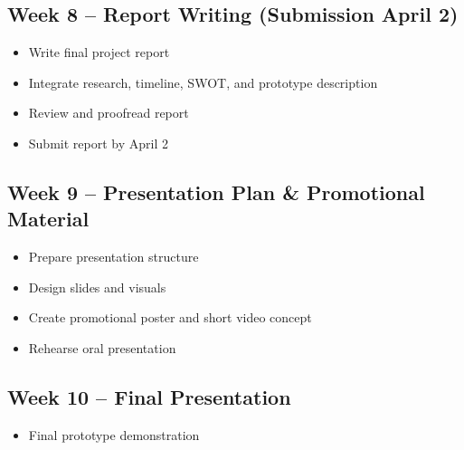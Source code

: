 \documentclass{article}
\begin{document}
\subsection*{Week 8 – Report Writing (Submission April 2)}
\begin{itemize}
    \item Write final project report
    \item Integrate research, timeline, SWOT, and prototype description
    \item Review and proofread report
    \item Submit report by April 2
\end{itemize}

\subsection*{Week 9 – Presentation Plan \& Promotional Material}
\begin{itemize}
    \item Prepare presentation structure
    \item Design slides and visuals
    \item Create promotional poster and short video concept
    \item Rehearse oral presentation
\end{itemize}

\subsection*{Week 10 – Final Presentation}
\begin{itemize}
    \item Final prototype demonstration
\end{itemize}
\end{document}
